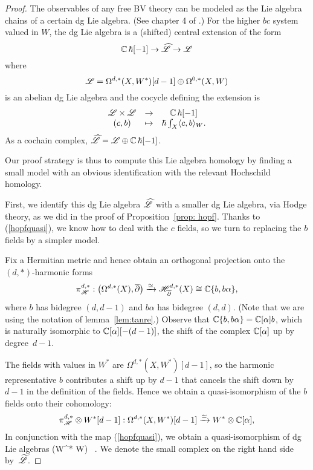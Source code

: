 \begin{proof}
The observables of any free BV theory can be modeled as the Lie algebra chains of a certain dg Lie algebra. 
(See chapter 4 of \cite{CG1}.)
For the higher $bc$ system valued in $W$, the dg Lie algebra is a (shifted) central extension of the form
\[
\mathbb C  \,\hbar [-1] \to \widehat{\mathscr L} \to \mathscr L
\]
where
\[
\mathscr L = \Omega^{d,*}(X, W^*)[d-1] \oplus \Omega^{0,*}(X, W)
\]
is an abelian dg Lie algebra and the cocycle defining the extension is
\[
\begin{array}{ccc}
\mathscr L \times \mathscr L & \to & \mathbb C \, \hbar [-1]\\
 (c, b) &\mapsto& \hbar \int_X \langle c, b\rangle_W .
\end{array}
\] 
As a cochain complex, $\widehat{\mathscr L} = \mathscr L \oplus \mathbb C  \,\hbar[-1]$. 

Our proof strategy is thus to compute this Lie algebra homology by finding a small model with an obvious identification with the relevant Hochschild homology.

First, we identify this dg Lie algebra $\widehat{\mathscr L}$ with a smaller dg Lie algebra, via Hodge theory, 
as we did in the proof of Proposition~\ref{prop: hopf}.
Thanks to  (\ref{hopfquasi}), we know how to deal with the $c$ fields,
so we turn to replacing the $b$ fields by a simpler model.

Fix a Hermitian metric and hence obtain an orthogonal projection onto the $(d,*)$-harmonic forms
\[
\pi_{\mathscr H}^{d,*} : \left(\Omega^{d,*}(X), \overline{\partial} \right) \xrightarrow{\simeq} \mathscr H^{d,*}_{\overline{\partial}}(X) \cong \mathbb C\{b, b \alpha\},
\]
where $b$ has bidegree $(d,d-1)$ and $b \alpha$ has bidegree $(d,d)$.
(Note that we are using the notation of lemma~\ref{lem:tanre}.)
Observe that $\mathbb C\{b, b \alpha\} = \mathbb C[\alpha]b$, which is naturally isomorphic to $\mathbb C[\alpha][-(d-1)]$,
the shift of the complex $\mathbb C[\alpha]$ up by degree~$d-1$.

The fields with values in $W^*$ are $\Omega^{d,*}(X, W^*)[d-1] $, 
so the harmonic representative $b$ contributes a shift up by $d-1$ that cancels the shift down by $d-1$ in the definition of the fields. 
Hence we obtain a quasi-isomorphism of the $b$ fields onto their cohomology:
\[
\pi_{\mathscr H}^{d,*} \otimes W^* [d-1]: \Omega^{d,*}(X, W^*)[d-1] \xrightarrow{\simeq} W^* \otimes \mathbb C[\alpha],
\]
In conjunction with the map (\ref{hopfquasi}), 
we obtain a quasi-isomorphism of dg Lie algebras
\beqn
\label{hopfquasi2}
\Hat{\sL} \xto{\simeq}  \CC[\alpha] \tensor (W^* \oplus W) \oplus \CC \, \hbar [-1]. 
\eeqn
We denote the small complex on the right hand side by~$\widetilde{\mathscr L}$.


\end{proof}
